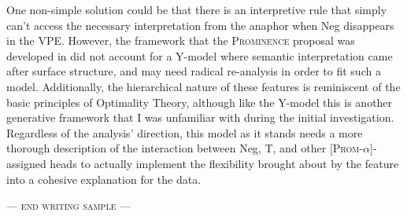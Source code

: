 \documentclass[11pt, oneside]{article}
\begin{document}
One non-simple solution could be that there is an interpretive rule that simply can't access the necessary interpretation from the anaphor when Neg disappears in the VPE. However, the framework that the \textsc{Prominence} proposal was developed in did not account for a Y-model where semantic interpretation came after surface structure, and may need radical re-analysis in order to fit such a model. Additionally, the hierarchical nature of these features is reminiscent of the basic principles of Optimality Theory, although like the Y-model this is another generative framework that I was unfamiliar with during the initial investigation. Regardless of the analysis' direction, this model as it stands needs a more thorough description of the interaction between Neg, T, and other \textsc{[Prom-$\alpha$]}-assigned heads to actually implement the flexibility brought about by the feature into a cohesive explanation for the data.

\centering
\bigskip\bigskip\bigskip
--- \textsc{end writing sample} ---
\end{document}
